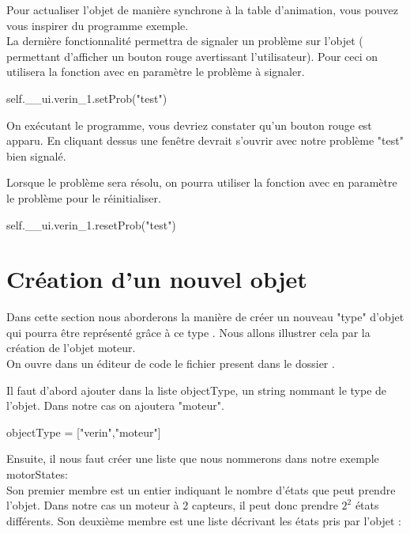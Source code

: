 Pour actualiser l'objet de manière synchrone à la table d'animation, vous pouvez vous inspirer du programme exemple.\\

La dernière fonctionnalité permettra de signaler un problème sur l'objet ( permettant d'afficher un bouton rouge avertissant l'utilisateur). Pour ceci on utilisera la fonction  avec en paramètre le problème à signaler.

\begin{Python}
    self.__ui.verin_1.setProb("test")
\end{Python}

On exécutant le programme, vous devriez constater qu'un bouton rouge est apparu. En cliquant dessus une fenêtre devrait s'ouvrir avec notre problème "test" bien signalé.


Lorsque le problème sera résolu, on pourra utiliser la fonction  avec en paramètre le problème pour le réinitialiser.
\begin{Python}
    self.__ui.verin_1.resetProb("test")
\end{Python}


\section{Création d'un nouvel objet}

Dans cette section nous aborderons la manière de créer un nouveau "type" d'objet qui pourra être représenté grâce à ce type . Nous allons illustrer cela par la création de l'objet moteur.\\


On ouvre dans un éditeur de code le fichier  present dans le dossier .


Il faut d'abord ajouter dans la liste objectType, un string nommant le type de l'objet. Dans notre cas on ajoutera "moteur". 
\begin{Python}
        objectType = ["verin","moteur"]
\end{Python}


Ensuite, il nous faut créer une liste que nous nommerons dans notre exemple motorStates:\\

Son premier membre est un entier indiquant le nombre d'états que peut prendre l'objet. Dans notre cas un moteur à 2 capteurs, il peut donc prendre $ 2^2 $ états différents.
Son deuxième membre est une liste décrivant les états pris par l'objet :

